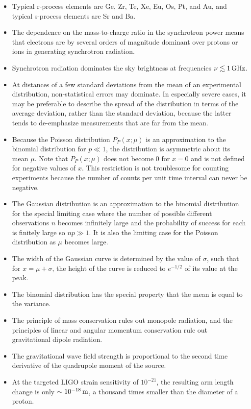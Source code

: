 \documentclass[a4paper,10pt]{article}
\begin{document}
\begin{itemize}
    \item Typical r-process elements are Ge, Zr, Te, Xe, Eu, Os, Pt, and Au, and typical s-process elements are Sr and Ba.
    \item The dependence on the mass-to-charge ratio in the synchrotron power means that electrons are by several orders of magnitude dominant over protons or ions in generating synchrotron radiation.
    \item Synchrotron radiation dominates the sky brightness at frequencies $\nu\lesssim1\,{\rm GHz}$.
    \item At distances of a few standard deviations from the mean of an experimental distribution, non-statistical errors may dominate. In especially severe cases, it may be preferable to describe the spread of the distribution in terms of the average deviation, rather than the standard deviation, because the latter tends to de-emphasize measurements that are far from the mean.
    \item Because the Poisson distribution $P_P(x;\mu)$ is an approximation to the binomial distribution for $p\ll1$, the distribution is asymmetric about its mean $\mu$. Note that $P_P(x;\mu)$ does not become $0$ for $x=0$ and is not defined for negative values of $x$. This restriction is not troublesome for counting experiments because the number of counts per unit time interval can never be negative.
    \item The Gaussian distribution is an approximation to the binomial distribution for the special limiting case where the number of possible different observations $n$ becomes infinitely large and the probability of success for each is finitely large so $np\gg1$. It is also the limiting case for the Poisson distribution as $\mu$ becomes large.
    \item The width of the Gaussian curve is determined by the value of $\sigma$, such that for $x=\mu+\sigma$, the height of the curve is reduced to $e^{-1/2}$ of its value at the peak.
    \item The binomial distribution has the special property that the mean is equal to the variance.
    \item The principle of mass conservation rules out monopole radiation, and the principles of linear and angular momentum conservation rule out gravitational dipole radiation.
    \item The gravitational wave field strength is proportional to the second time derivative of the quadrupole moment of the source.
    \item At the targeted LIGO strain sensitivity of $10^{-21}$, the resulting arm length change is only $\sim10^{-18}\,{\rm m}$, a thousand times smaller than the diameter of a proton.

\end{itemize}
\end{document}

